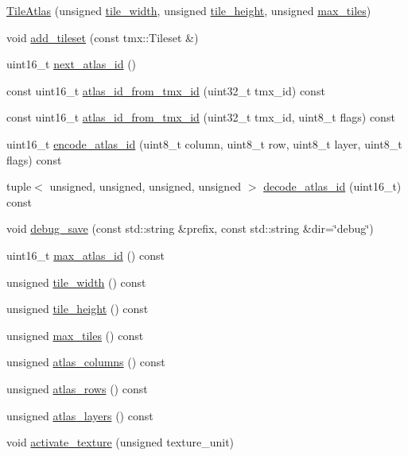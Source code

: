 \begin{DoxyCompactItemize}
\item 
\hyperlink{classpixel_1_1_tile_atlas_a1a93c32c0436c245eb8a542c4130aaed}{Tile\+Atlas} (unsigned \hyperlink{classpixel_1_1_tile_atlas_a6ff6223361e310fd1fab9d0508a6ad89}{tile\+\_\+width}, unsigned \hyperlink{classpixel_1_1_tile_atlas_abed446514a251b9b5ff61d49aab7c3af}{tile\+\_\+height}, unsigned \hyperlink{classpixel_1_1_tile_atlas_ac21fb9315b15847cef295e978e6da343}{max\+\_\+tiles})
\item 
void \hyperlink{classpixel_1_1_tile_atlas_afc350aae3a476bdbb59873879173363e}{add\+\_\+tileset} (const tmx\+::\+Tileset \&)
\item 
uint16\+\_\+t \hyperlink{classpixel_1_1_tile_atlas_a6c1e001982374ea5296a74f6214b158b}{next\+\_\+atlas\+\_\+id} ()
\item 
const uint16\+\_\+t \hyperlink{classpixel_1_1_tile_atlas_a4e71b86af4e568ceec4847b4c5cd06f5}{atlas\+\_\+id\+\_\+from\+\_\+tmx\+\_\+id} (uint32\+\_\+t tmx\+\_\+id) const
\item 
const uint16\+\_\+t \hyperlink{classpixel_1_1_tile_atlas_ad6fa15cdb46bdd8ca0366375c1c6be7c}{atlas\+\_\+id\+\_\+from\+\_\+tmx\+\_\+id} (uint32\+\_\+t tmx\+\_\+id, uint8\+\_\+t flags) const
\item 
uint16\+\_\+t \hyperlink{classpixel_1_1_tile_atlas_a2c82229d33fecdcc42acde2f483961d4}{encode\+\_\+atlas\+\_\+id} (uint8\+\_\+t column, uint8\+\_\+t row, uint8\+\_\+t layer, uint8\+\_\+t flags) const
\item 
tuple$<$ unsigned, unsigned, unsigned, unsigned $>$ \hyperlink{classpixel_1_1_tile_atlas_aa117e34475453f9809d04ab2c29b543d}{decode\+\_\+atlas\+\_\+id} (uint16\+\_\+t) const
\item 
void \hyperlink{classpixel_1_1_tile_atlas_aafcead07e2b9443341f3a8bc88ad003b}{debug\+\_\+save} (const std\+::string \&prefix, const std\+::string \&dir=\char`\"{}debug\char`\"{})
\item 
uint16\+\_\+t \hyperlink{classpixel_1_1_tile_atlas_a47522bb62a8025d9354ee73f1c47dea8}{max\+\_\+atlas\+\_\+id} () const
\item 
unsigned \hyperlink{classpixel_1_1_tile_atlas_a6ff6223361e310fd1fab9d0508a6ad89}{tile\+\_\+width} () const
\item 
unsigned \hyperlink{classpixel_1_1_tile_atlas_abed446514a251b9b5ff61d49aab7c3af}{tile\+\_\+height} () const
\item 
unsigned \hyperlink{classpixel_1_1_tile_atlas_ac21fb9315b15847cef295e978e6da343}{max\+\_\+tiles} () const
\item 
unsigned \hyperlink{classpixel_1_1_tile_atlas_ae83fef97dd8bc426dd16c9f0f50c3533}{atlas\+\_\+columns} () const
\item 
unsigned \hyperlink{classpixel_1_1_tile_atlas_a7e622cf32418443225c4b4f9afd20258}{atlas\+\_\+rows} () const
\item 
unsigned \hyperlink{classpixel_1_1_tile_atlas_aa5ae1812212e58ba29f7181ef2e958a5}{atlas\+\_\+layers} () const
\item 
void \hyperlink{classpixel_1_1_tile_atlas_a52f01d601f75641fa84661497c3859a1}{activate\+\_\+texture} (unsigned texture\+\_\+unit)
\end{DoxyCompactItemize}

